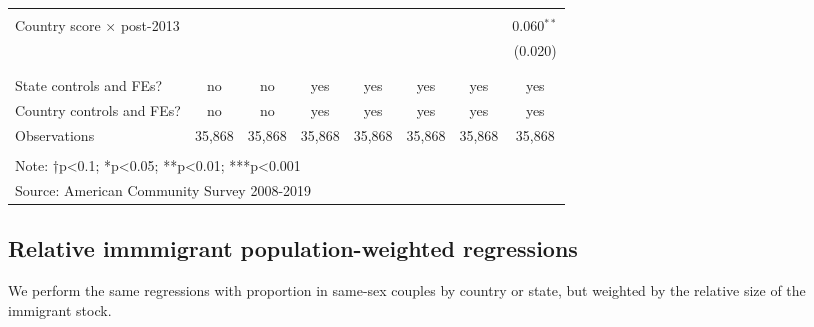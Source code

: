 \documentclass[
  11pt,
]{article}
\begin{document}
\begin{table}[!htbp]
\begin{tabular}{@{\extracolsep{5pt}}lccccccc}
  & & & & & & & \\ 
 Country score × post-2013 &  &  &  &  &  &  & 0.060$^{**}$ \\ 
  &  &  &  &  &  &  & (0.020) \\ 
  & & & & & & & \\ 
\hline \\[-1.8ex] 
State controls and FEs? & no & no & yes & yes & yes & yes & yes \\ 
Country controls and FEs? & no & no & yes & yes & yes & yes & yes \\ 
Observations & 35,868 & 35,868 & 35,868 & 35,868 & 35,868 & 35,868 & 35,868 \\ 
\hline 
\hline \\[-1.8ex] 
\multicolumn{8}{l}{Note: †p<0.1; *p<0.05; **p<0.01; ***p<0.001} \\ 
\multicolumn{8}{l}{Source: American Community Survey 2008-2019} \\ 
\end{tabular} 
\end{table}

\hypertarget{relative-immmigrant-population-weighted-regressions}{%
\subsection{Relative immmigrant population-weighted regressions}\label{relative-immmigrant-population-weighted-regressions}}

We perform the same regressions with proportion in same-sex couples by country or state, but weighted by the relative size of the immigrant stock.
\end{document}
